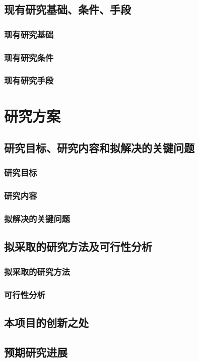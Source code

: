 \documentclass{ctexart}
\begin{document}
\subsection{现有研究基础、条件、手段}
\subsubsection{现有研究基础}
\subsubsection{现有研究条件}
\subsubsection{现有研究手段}

\section{研究方案}
\subsection{研究目标、研究内容和拟解决的关键问题}
\subsubsection{研究目标}
\subsubsection{研究内容}
\subsubsection{拟解决的关键问题}
\subsection{拟采取的研究方法及可行性分析}
\subsubsection{拟采取的研究方法}
\subsubsection{可行性分析}

\subsection{本项目的创新之处}
\subsection{预期研究进展}
\end{document}
